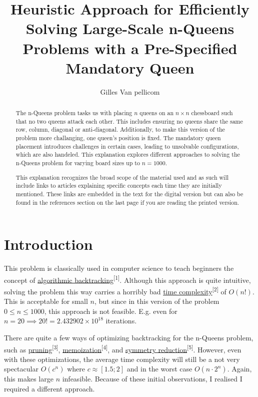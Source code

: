 \documentclass{article}
\title{Heuristic Approach for Efficiently Solving Large-Scale n-Queens Problems with a Pre-Specified Mandatory Queen}
\author{Gilles Van pellicom}
\begin{document}
\maketitle

\begin{abstract}
    \setlength{\parindent}{0pt}
    \setlength{\parskip}{1em}
    The n-Queens problem tasks us with placing \(n\) queens on an \(n \times n\) chessboard such that no two queens attack each other.
    This includes ensuring no queens share the same row, column, diagonal or anti-diagonal. Additionally, to make this version of the problem more challanging,
    one queen's position is fixed.
    The mandatory queen placement introduces challenges in certain cases, leading to unsolvable configurations, which are also handeled.
    This explanation explores different approaches to solving the n-Queens problem for varying board sizes up to \(n = 1000\).

    This explanation recognizes the broad scope of the material used and as such will include links to articles explaining specific concepts
    each time they are initially mentioned. These links are embedded in the text for the digital version but can also be found in the references section on the last page if you are reading the printed version.
\end{abstract}

\section{Introduction}
This problem is classically used in computer science to teach beginners the concept of \href{https://en.wikipedia.org/wiki/Backtracking}{algorithmic backtracking}\textsuperscript{[1]}.
Although this approach is quite intuitive, solving the problem this way carries a horribly bad \href{https://en.wikipedia.org/wiki/Time_complexity}{time complexity}\textsuperscript{[2]} of \(O(n!)\).
This is acceptable for small \(n\), but since in this version of the problem \(0 \leq n \leq 1000\), this approach is not feasible.
E.g. even for \(n = 20 \implies 20! = 2.432902 \times 10^{18}\) iterations.

There are quite a few ways of optimizing backtracking for the n-Queens problem, such as \href{https://en.wikipedia.org/wiki/Decision_tree_pruning}{pruning}\textsuperscript{[3]},
\href{https://en.wikipedia.org/wiki/Memoization}{memoization}\textsuperscript{[4]}, and \href{https://www.khoury.northeastern.edu/home/wahl/Publications/ew05b.pdf}{symmetry reduction}\textsuperscript{[5]}.
However, even with these optimizations, the average time complexity will still be a not very spectacular \(O(c^n)\) where \(c \approx [1.5; 2]\) and in the worst case
\(O(n \cdot 2^n)\). Again, this makes large \(n\) infeasible.
Because of these initial observations, I realised I required a different approach.
\end{document}
